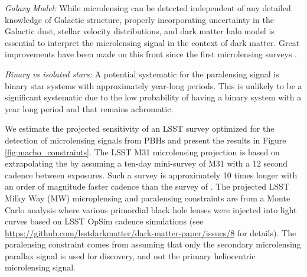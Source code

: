 \emph{Galaxy Model:} While microlensing can be detected independent of any detailed knowledge of Galactic structure, properly incorporating uncertainty in the Galactic dust, stellar velocity distributions, and dark matter halo model is essential to interpret the microlensing signal in the context of dark matter.
Great improvements have been made on this front since the first microlensing surveys \citep[e.g.,][]{2018MNRAS.479.2889C}.

\emph{Binary vs isolated stars:} A potential systematic for the paralensing signal is binary star systems with approximately year-long periods. This is unlikely to be a significant systematic due to the low probability of having a binary system with a year long period and that remains achromatic. %



We estimate the projected sensitivity of an LSST survey optimized for the detection of microlensing signals from PBHs and present the results in Figure \ref{fig:macho_constraints}.
The LSST M31 microlensing projection is based on extrapolating the \citet{2017arXiv170102151N} by assuming a ten-day mini-survey of M31 with a 12 second cadence between exposures.
Such a survey is approximately 10 times longer with an order of magnitude faster cadence than the survey of \citet{2017arXiv170102151N}.
The projected LSST Milky Way (MW) microplensing and paralensing constraints are from a Monte Carlo analysis where various primordial black hole lenses were injected into light curves based on LSST OpSim cadence simulations (see \url{https://github.com/lsstdarkmatter/dark-matter-paper/issues/8} for details).
The paralensing constraint comes from assuming that only the secondary microlensing parallax signal is used for discovery, and not the primary heliocentric microlensing signal.

